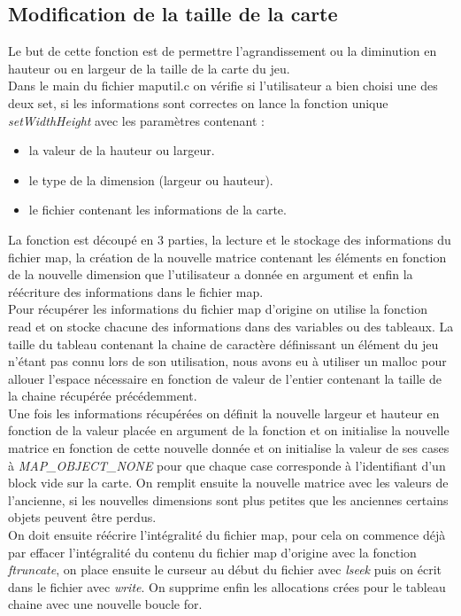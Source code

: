 \documentclass[10pt,a4paper]{article}
\begin{document}
\subsection{Modification de la taille de la carte}
\quad Le but de cette fonction est de permettre l'agrandissement ou la diminution en hauteur ou en largeur de la taille de la carte du jeu.\\
\quad Dans le main du fichier maputil.c on vérifie si l'utilisateur a bien choisi une des deux set, si les informations sont correctes on lance la fonction unique \textit{setWidthHeight} avec les paramètres contenant :\\
\begin{itemize}
\item la valeur de la hauteur ou largeur.
\item le type de la dimension (largeur ou hauteur).
\item le fichier contenant les informations de la carte.
\end{itemize}
\quad La fonction est découpé en 3 parties, la lecture et le stockage des informations du fichier map, la création de la nouvelle matrice contenant les éléments en fonction de la nouvelle dimension que l'utilisateur a donnée en argument et enfin la réécriture des informations dans le fichier map.\\
\quad Pour récupérer les informations du fichier map d'origine on utilise la fonction read et on stocke chacune des informations dans des variables ou des tableaux. La taille du tableau contenant la chaine de caractère définissant un élément du jeu n'étant pas connu lors de son utilisation, nous avons eu à utiliser un malloc pour allouer l'espace nécessaire en fonction de valeur de l'entier contenant la taille de la chaine récupérée précédemment.\\
\quad Une fois les informations récupérées on définit la nouvelle largeur et hauteur en fonction de la valeur placée en argument de la fonction et on initialise la nouvelle matrice en fonction de cette nouvelle donnée et on initialise la valeur de ses cases à \textit{MAP\_OBJECT\_NONE} pour que chaque case corresponde à l'identifiant d'un block vide sur la carte. On remplit ensuite la nouvelle matrice avec les valeurs de l'ancienne, si les nouvelles dimensions sont plus petites que les anciennes certains objets peuvent être perdus.\\
\quad On doit ensuite réécrire l'intégralité du fichier map, pour cela on commence déjà par effacer l'intégralité du contenu du fichier map d'origine avec la fonction \textit{ftruncate}, on place ensuite le curseur au début du fichier avec \textit{lseek} puis on écrit dans le fichier avec \textit{write}. On supprime enfin les allocations crées pour le tableau chaine avec une nouvelle boucle for.        
    
\end{document}
